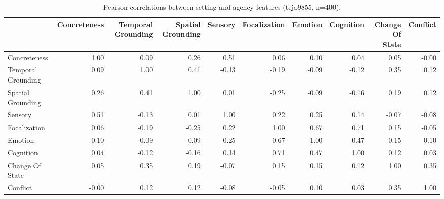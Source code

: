 \begin{table}[ht]
\caption{Pearson correlations between setting and agency features (tejo9855, n=400).}
\label{tab:pearson_feature_corr}
\begin{tabular}{lrrrrrrrrr}
\toprule
 & Concreteness & Temporal Grounding & Spatial Grounding & Sensory & Focalization & Emotion & Cognition & Change Of State & Conflict \\
\midrule
Concreteness & 1.00 & 0.09 & 0.26 & 0.51 & 0.06 & 0.10 & 0.04 & 0.05 & -0.00 \\
Temporal Grounding & 0.09 & 1.00 & 0.41 & -0.13 & -0.19 & -0.09 & -0.12 & 0.35 & 0.12 \\
Spatial Grounding & 0.26 & 0.41 & 1.00 & 0.01 & -0.25 & -0.09 & -0.16 & 0.19 & 0.12 \\
Sensory & 0.51 & -0.13 & 0.01 & 1.00 & 0.22 & 0.25 & 0.14 & -0.07 & -0.08 \\
Focalization & 0.06 & -0.19 & -0.25 & 0.22 & 1.00 & 0.67 & 0.71 & 0.15 & -0.05 \\
Emotion & 0.10 & -0.09 & -0.09 & 0.25 & 0.67 & 1.00 & 0.47 & 0.15 & 0.10 \\
Cognition & 0.04 & -0.12 & -0.16 & 0.14 & 0.71 & 0.47 & 1.00 & 0.12 & 0.03 \\
Change Of State & 0.05 & 0.35 & 0.19 & -0.07 & 0.15 & 0.15 & 0.12 & 1.00 & 0.35 \\
Conflict & -0.00 & 0.12 & 0.12 & -0.08 & -0.05 & 0.10 & 0.03 & 0.35 & 1.00 \\
\bottomrule
\end{tabular}
\end{table}

